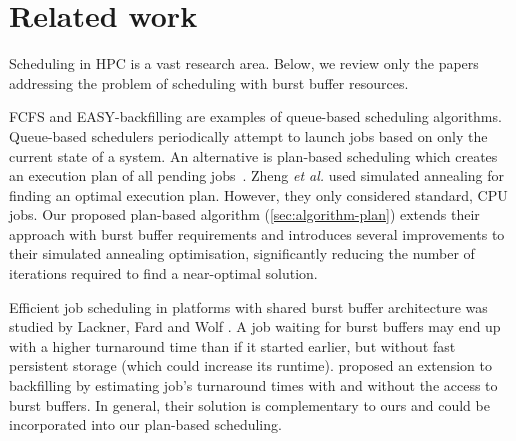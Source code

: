 \documentclass[runningheads]{llncs}
\begin{document}


\section{Related work} \label{sec:related-work}
Scheduling in HPC is a vast research area. Below, we review only the papers addressing the problem of scheduling with burst buffer resources.

FCFS and EASY-backfilling are examples of queue-based scheduling algorithms. Queue-based schedulers periodically attempt to launch jobs based on only the current state of a system. An alternative is plan-based scheduling which creates an execution plan of all pending jobs~\cite{hovestadt2003scheduling}. Zheng \textit{et al.} \cite{7776518} used simulated annealing for finding an optimal execution plan. However, they only considered standard, CPU jobs. %
Our proposed plan-based algorithm (\cref{sec:algorithm-plan}) extends their approach with burst buffer requirements and introduces several improvements to their simulated annealing optimisation, significantly reducing the number of iterations required to find a near-optimal solution. 

Efficient job scheduling in platforms with shared burst buffer architecture was studied by Lackner, Fard and Wolf \cite{8752797}.
A job waiting for burst buffers may end up with a higher turnaround time than if it started earlier, but without fast persistent storage (which could increase its runtime).
\cite{8752797} proposed an extension to backfilling by estimating job's turnaround times with and without the access to burst buffers.
In general, their solution is complementary to ours and could be incorporated into our plan-based scheduling.
\end{document}
